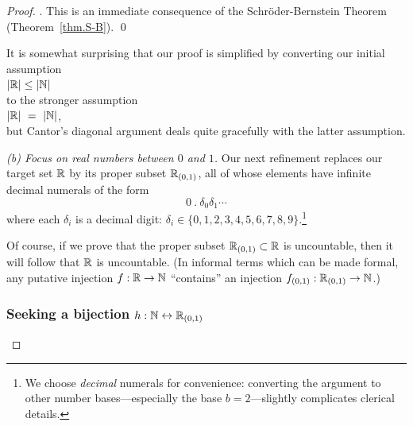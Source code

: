 \begin{proof}
.
This is an immediate consequence of the Schr\"{o}der-Bernstein Theorem
(Theorem~\ref{thm.S-B}).  \qed

\medskip

It is somewhat surprising that our proof is simplified by converting
our initial assumption \\
\hspace*{.35in}$|\mathbb{R}| \leq |\mathbb{N}|$ \\
to the stronger assumption \\
\hspace*{.35in}$|\mathbb{R}| \ = \ |\mathbb{N}|$,  \\
but Cantor's diagonal argument deals quite gracefully with the latter
assumption.

\medskip

{\it (b) Focus on real numbers between $0$ and $1$.}
Our next refinement replaces our target set $\mathbb{R}$ by its proper subset
$\mathbb{R}_{(0,1)}$, all of whose elements have infinite decimal numerals of
the form
\[ 0 \ . \ \delta_0 \delta_1 \cdots \]
where each $\delta_i$ is a decimal digit: $\delta_i \in \{0, 1, 2, 3,
4, 5, 6, 7, 8, 9\}$.\footnote{We choose {\em decimal} numerals for
  convenience: converting the argument to other number
  bases---especially the base $b=2$---slightly complicates clerical
  details.}

Of course, if we prove that the proper subset $\mathbb{R}_{(0,1)} \subset \mathbb{R}$
is uncountable, then it will follow that $\mathbb{R}$ is uncountable.  (In
informal terms which can be made formal, any putative injection $f: \mathbb{R}
\rightarrow \mathbb{N}$ ``contains'' an injection $f_{(0,1)}: \mathbb{R}_{(0,1)}
\rightarrow \mathbb{N}$.)

\subsubsection{Seeking a bijection $h: \mathbb{N} \leftrightarrow \mathbb{R}_{(0,1)}$}


\end{proof}
